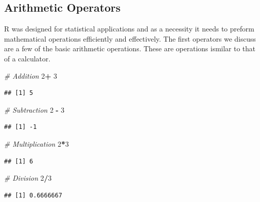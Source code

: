 \documentclass[
]{book}
\newenvironment{Shaded}{\begin{snugshade}}{\end{snugshade}}
\newcommand{\CommentTok}[1]{\textcolor[rgb]{0.56,0.35,0.01}{\textit{#1}}}
\newcommand{\DecValTok}[1]{\textcolor[rgb]{0.00,0.00,0.81}{#1}}
\newcommand{\OperatorTok}[1]{\textcolor[rgb]{0.81,0.36,0.00}{\textbf{#1}}}
\newcommand{\StringTok}[1]{\textcolor[rgb]{0.31,0.60,0.02}{#1}}
\begin{document}
\hypertarget{arithmetic-operators}{%
\subsection*{Arithmetic Operators}\label{arithmetic-operators}}

R was designed for statistical applications and as a necessity it needs to preform mathematical operations efficiently and effectively. The first operators we discuss are a few of the basic arithmetic operations. These are operations ismilar to that of a calculator.

\begin{Shaded}
\begin{Highlighting}[]
\CommentTok{# Addition }
\DecValTok{2}\OperatorTok{+}\StringTok{ }\DecValTok{3}
\end{Highlighting}
\end{Shaded}

\begin{verbatim}
## [1] 5
\end{verbatim}

\begin{Shaded}
\begin{Highlighting}[]
\CommentTok{# Subtraction }
\DecValTok{2} \OperatorTok{-}\StringTok{ }\DecValTok{3}
\end{Highlighting}
\end{Shaded}

\begin{verbatim}
## [1] -1
\end{verbatim}

\begin{Shaded}
\begin{Highlighting}[]
\CommentTok{# Multiplication }
\DecValTok{2}\OperatorTok{*}\DecValTok{3}
\end{Highlighting}
\end{Shaded}

\begin{verbatim}
## [1] 6
\end{verbatim}

\begin{Shaded}
\begin{Highlighting}[]
\CommentTok{# Division }
\DecValTok{2}\OperatorTok{/}\DecValTok{3}
\end{Highlighting}
\end{Shaded}

\begin{verbatim}
## [1] 0.6666667
\end{verbatim}
\end{document}
